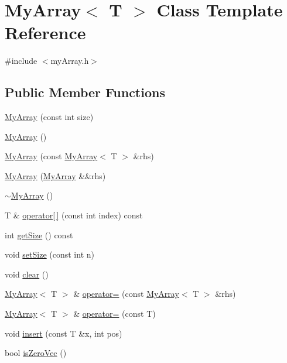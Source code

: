 \hypertarget{classMyArray}{}\section{My\+Array$<$ T $>$ Class Template Reference}
\label{classMyArray}


{\ttfamily \#include $<$my\+Array.\+h$>$}

\subsection*{Public Member Functions}
\begin{DoxyCompactItemize}
\item 
\hyperlink{classMyArray_a5e2f56ae6e3b87c1635bedf8b4b76fb9}{My\+Array} (const int size)
\item 
\hyperlink{classMyArray_acb3cd41349cf47f00e119061894929a6}{My\+Array} ()
\item 
\hyperlink{classMyArray_a03c11ccacb545bdcaf686747d3dc741d}{My\+Array} (const \hyperlink{classMyArray}{My\+Array}$<$ T $>$ \&rhs)
\item 
\hyperlink{classMyArray_a614502f17fa14578ed29c99cb9a9861e}{My\+Array} (\hyperlink{classMyArray}{My\+Array} \&\&rhs)
\item 
\hyperlink{classMyArray_a55bc32d921ca509c9820549cb8baac22}{$\sim$\+My\+Array} ()
\item 
T \& \hyperlink{classMyArray_a29386688c63b9c7694fcaea57e772781}{operator\mbox{[}$\,$\mbox{]}} (const int index) const 
\item 
int \hyperlink{classMyArray_a0b7673af1b2f8d69f9345b3fd817cce4}{get\+Size} () const 
\item 
void \hyperlink{classMyArray_ab2e0c78689ddcfd142dbef361b7c0339}{set\+Size} (const int n)
\item 
void \hyperlink{classMyArray_a631fd2535793febd2f7acd7c70ca94b6}{clear} ()
\item 
\hyperlink{classMyArray}{My\+Array}$<$ T $>$ \& \hyperlink{classMyArray_a2f16f482ff8b1f600d288a9ca04c2658}{operator=} (const \hyperlink{classMyArray}{My\+Array}$<$ T $>$ \&rhs)
\item 
\hyperlink{classMyArray}{My\+Array}$<$ T $>$ \& \hyperlink{classMyArray_a04128aefb2c6a87d84cc29fdc6aeade7}{operator=} (const T)
\item 
void \hyperlink{classMyArray_a0c00635e4361df03eff1c371c1ab5567}{insert} (const T \&x, int pos)
\item 
bool \hyperlink{classMyArray_a75f3601d5480f089016a20eb3a1d3918}{is\+Zero\+Vec} ()

\end{DoxyCompactItemize}
